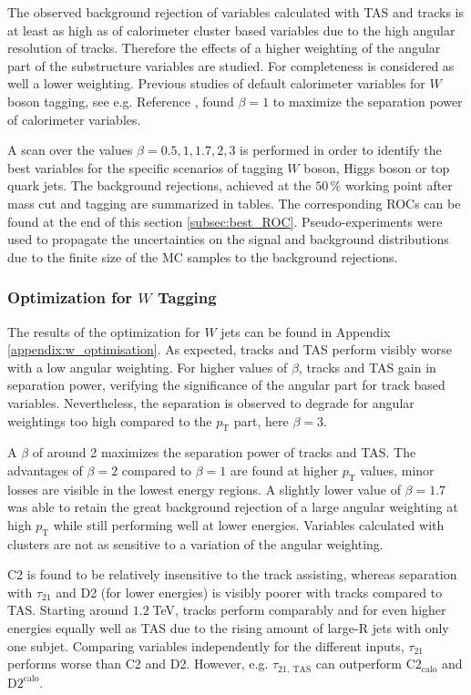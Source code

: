 The observed background rejection of variables calculated with TAS and tracks is at least as high as of calorimeter cluster based variables due to the high angular resolution of tracks. Therefore the effects of a higher weighting of the angular part of the substructure variables are studied.  For completeness is considered as well a lower weighting. Previous studies of default calorimeter variables for $W$ boson tagging, see e.g. Reference \cite{bib:w_tagging}, found $\beta=1$ to maximize the separation power of calorimeter variables.

A scan over the values $\beta= 0.5, 1, 1.7, 2, 3$ is performed in order to identify the best variables for the specific scenarios of tagging $W$ boson, Higgs boson or top quark jets. The background rejections, achieved at the $50\,\%$ working point after mass cut and tagging are summarized in tables. The corresponding ROCs can be found at the end of this section \ref{subsec:best_ROC}. Pseudo-experiments were used to propagate the uncertainties on the signal and background distributions due to the finite size of the MC samples to the background rejections. 

\subsubsection{Optimization for $W$ Tagging}
The results of the optimization for $W$ jets can be found in Appendix \ref{appendix:w_optimisation}. As expected, tracks and TAS perform visibly worse with a low angular weighting. For higher values of $\beta$, tracks and TAS gain in separation power, verifying the significance of the angular part for track based variables. Nevertheless, the separation is observed to degrade for angular weightings too high compared to the $p_{\mathrm{T}}$ part, here $\beta=3$.

A $\beta$ of around 2 maximizes the separation power of tracks and TAS. The advantages of $\beta=2$ compared to $\beta=1$ are found at higher $p_{\mathrm{T}}$ values, minor losses are visible in the lowest energy regions. A slightly lower value of $\beta=1.7$ was able to retain the great background rejection of a large angular weighting at high $p_{\mathrm{T}}$ while still performing well at lower energies. Variables calculated with clusters are not as sensitive to a variation of the angular weighting.

C2 is found to be relatively insensitive to the track assisting, whereas separation with $\tau_{21}$ and D2 (for lower energies) is visibly poorer with tracks compared to TAS.  Starting around $1.2\;$TeV, tracks perform comparably and for even higher energies equally well as TAS due to the rising amount of large-R jets with only one subjet. Comparing variables independently for the different inputs, $\tau_{21}$ performs worse than C2 and D2. However, e.g. $\tau_{21,\: \text{TAS}}$ can outperform $\text{C2}_{\text{calo}}$ and $\text{D2}^{\text{calo}}$.

